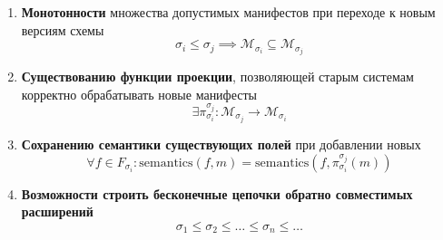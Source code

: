\documentclass{article}
\begin{document}
\begin{enumerate}
    \item \textbf{Монотонности} множества допустимых манифестов при переходе к новым версиям схемы
    \[
    \sigma_i \leq \sigma_j \implies \mathcal{M}_{\sigma_i} \subseteq \mathcal{M}_{\sigma_j}
    \]
    
    \item \textbf{Существованию функции проекции}, позволяющей старым системам корректно обрабатывать новые манифесты
    \[
    \exists \pi_{\sigma_i}^{\sigma_j}: \mathcal{M}_{\sigma_j} \to \mathcal{M}_{\sigma_i}
    \]
    
    \item \textbf{Сохранению семантики существующих полей} при добавлении новых
    \[
    \forall f \in F_{\sigma_i}: \text{semantics}(f, m) = \text{semantics}(f, \pi_{\sigma_i}^{\sigma_j}(m))
    \]
    
    \item \textbf{Возможности строить бесконечные цепочки обратно совместимых расширений}
    \[
    \sigma_1 \leq \sigma_2 \leq \ldots \leq \sigma_n \leq \ldots
    \]
\end{enumerate}
\end{document}
